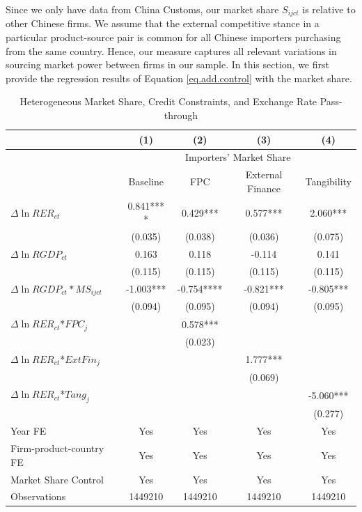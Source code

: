 \documentclass[12pt]{article}
\begin{document}
Since we only have data from China Customs, our market share $S_{ijct}$ is relative to other Chinese firms. We assume that the external competitive stance in a particular product-source pair is common for all Chinese importers purchasing from the same country. Hence, our measure captures all relevant variations in sourcing market power between firms in our sample. In this section, we first provide the regression results of Equation \ref{eq.add.control} with the market share. 

\begin{table}[htbp]
	\centering
	\caption{Heterogeneous Market Share, Credit Constraints, and Exchange Rate Pass-through}
	\begin{threeparttable}
		\begin{tabular}{lcccc}
			\toprule
			& (1)   & (2)   & (3)   & (4) \\
			\midrule
			& \multicolumn{4}{c}{Importers' Market Share}  \\
			&  Baseline     & FPC & External Finance& Tangibility        \\
			\midrule
			$\Delta \ln RER_{ct}$ & 0.841*** * & 0.429*** & 0.577*** & 2.060*** \\
			& (0.035) & (0.038) & (0.036) & (0.075) \\
			$\Delta \ln RGDP_{ct}$ & 0.163 & 0.118 & -0.114 & 0.141\\
			& (0.115) & (0.115) & (0.115) & (0.115) \\
			$\Delta \ln RGDP_{ct}*MS_{ijct}$ & -1.003***  & -0.754**** & -0.821*** & -0.805*** \\
			& (0.094) & (0.095) & (0.094) & (0.095) \\
			$\Delta \ln RER_{ct}$*$FPC_{j}$ &   & 0.578*** &       &  \\
			&       & (0.023) &       &  \\
			$\Delta \ln RER_{ct}$*$ExtFin_{j}$ &       &       & 1.777*** &  \\
			&      &       & (0.069) &  \\
			$\Delta \ln RER_{ct}$*$Tang_{j}$ &       &       &       & -5.060*** \\
			&       &       &       & (0.277) \\
			Year FE  & Yes  & Yes   & Yes   & Yes \\
			Firm-product-country FE & Yes    & Yes   & Yes   & Yes \\
			Market Share Control & Yes   & Yes   & Yes   & Yes \\
			Observations & 1449210  & 1449210 & 1449210 & 1449210 \\

\end{tabular}
\end{threeparttable}
\end{table}
\end{document}
